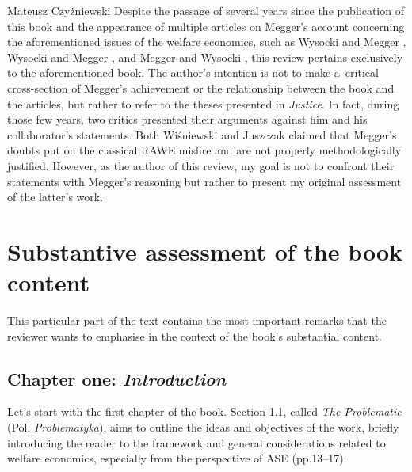 \begin{newrevengenv}{Mateusz Czyżniewski}
Despite the passage of several years since the publication of this book and the appearance of multiple articles on Megger's account concerning the aforementioned issues of the welfare economics, such as Wysocki and Megger 
\parencite*[][]{wysocki_austrian_2019}, %
 Wysocki and Megger 
\parencite*[][]{wysocki_rejoinder_2020}, %
 and Megger and Wysocki 
\parencite*[][]{megger_austriacka_2023}, %
 this review pertains exclusively to the aforementioned book. The author's intention is not to make a~critical cross-section of Megger's achievement or the relationship between the book and the articles, but rather to refer to the theses presented in \textit{Justice}. In fact, during those few years, two critics presented their arguments against him and his collaborator's statements. Both Wiśniewski 
\parencite*[][]{wisniewski_austrian_2019} %
 and Juszczak 
\parencite*[][]{juszczak_o_2021} %
 claimed that Megger's doubts put on the classical RAWE misfire and are not properly methodologically justified. However, as the author of this review, my goal is not to confront their statements with Megger's reasoning but rather to present my original assessment of the latter's work.



\section{Substantive assessment of the book content}

This particular part of the text contains the most important remarks that the reviewer wants to emphasise in the context of the book's substantial content.



\subsection{Chapter one: \textit{Introduction}}



Let's start with the first chapter of the book. Section 1.1, called \textit{The Problematic} (Pol: \textit{Problematyka}), aims to outline the ideas and objectives of the work, briefly introducing the reader to the framework and general considerations related to welfare economics, especially from the perspective of ASE (pp.13–17).




\end{newrevengenv}
